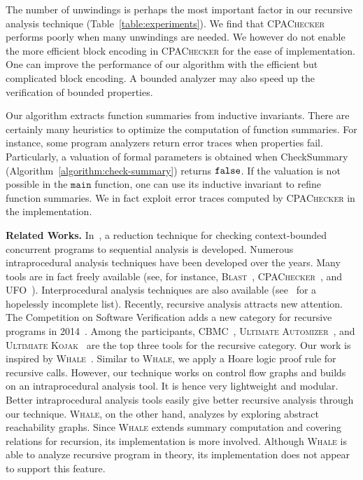 
The number of unwindings is perhaps the most important factor in our
recursive analysis technique (Table~\ref{table:experiments}). We find
that \textsc{CPAChecker} performs poorly when many unwindings are
needed. We however do not enable the more efficient block encoding in
\textsc{CPAChecker} for the ease of implementation. One can improve
the performance of our algorithm with the efficient but complicated
block encoding. A bounded analyzer may also speed up the
verification of bounded properties. 

Our algorithm extracts function summaries from inductive invariants. 
There are certainly many heuristics to optimize the computation of
function summaries. For instance, some program analyzers return error
traces when properties fail. Particularly, a valuation of formal
parameters is obtained when \textmd{CheckSummary}
(Algorithm~\ref{algorithm:check-summary}) returns $\mathtt{false}$. If the
valuation is not possible in the $\mathtt{main}$ function, one can use
its inductive invariant to refine function summaries. We in 
fact exploit error traces computed by \textsc{CPAChecker} in the
implementation. 

\noindent
\textbf{Related Works.}
In~\cite{LalR08,LalR09}, a reduction technique for checking context-bounded concurrent programs to sequential analysis is developed. Numerous intraprocedural analysis techniques have been developed over the years. Many tools are in fact freely available (see, for instance, \textsc{Blast}~\cite{BeyerHJM07}, \textsc{CPAChecker}~\cite{BeyerK11}, and \textsc{UFO}~\cite{AlbarghouthiLGC12}). Interprocedural analysis techniques are also available (see~\cite{RepsHS95,BallR01,CousotCFMMMR05,CuoqKKPSY12,coverity,polyspace} for a hopelessly incomplete list). Recently, recursive analysis attracts new attention. The Competition on Software Verification adds a new category for recursive programs in 2014~\cite{svcomp14}. Among the participants, \textsc{CBMC}~\cite{ClarkeKL04}, \textsc{Ultimate Automizer}~\cite{HeizmannCDEHLNSP13}, and \textsc{Ultimiate Kojak}~\cite{Kojak} are the top three tools for the recursive category. Our work is inspired by \textsc{Whale}~\cite{AlbarghouthiGC12}. Similar to \textsc{Whale}, we apply a Hoare logic proof rule for recursive calls. However, our technique works on control flow graphs and builds on an intraprocedural analysis tool. It is hence very lightweight and modular. Better intraprocedural analysis tools easily give better recursive analysis through our technique. \textsc{Whale}, on the other hand, analyzes by exploring abstract reachability graphs. Since \textsc{Whale} extends summary computation and covering relations for recursion, its implementation is more involved. Although \textsc{Whale} is able to analyze recursive program in theory, its implementation does not appear to support this feature.
